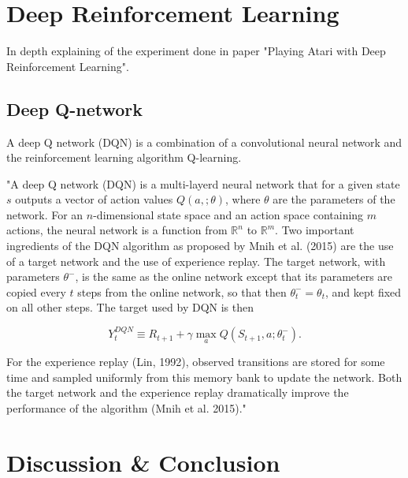 \documentclass[conference]{IEEEtran}
\begin{document}
\section{Deep Reinforcement Learning}
In depth explaining of the experiment done in paper "Playing Atari with Deep Reinforcement Learning".

\subsection{Deep Q-network}
A deep Q network (DQN) is a combination of a convolutional neural network and the reinforcement learning algorithm Q-learning. 

"A deep Q network (DQN) is a multi-layerd neural network that for a given state $s$ outputs a vector of action values $Q(a, ; \theta)$, where $\theta$ are the parameters of the network. For an $n$-dimensional state space and an action space containing $m$ actions, the neural network is a function from $\mathbb{R}^n$ to $\mathbb{R}^m$. Two important ingredients of the DQN algorithm as proposed by Mnih et al. (2015) are the use of a target network and the use of experience replay. The target network, with parameters $\theta^-$, is the same as the online network except that its parameters are copied every $t$ steps from the online network, so that then $\theta^-_t = \theta_t$, and kept fixed on all other steps. The target used by DQN is then

\begin{equation*}
Y^{DQN}_t \equiv R_{t+1} + \gamma \max_a Q(S_{t+1}, a; \theta^-_t).
\end{equation*}

For the experience replay (Lin, 1992), observed transitions are stored for some time and sampled uniformly from this memory bank to update the network. Both the target network and the experience replay dramatically improve the performance of the algorithm (Mnih et al. 2015)."

\section{Discussion \& Conclusion}



\end{document}
